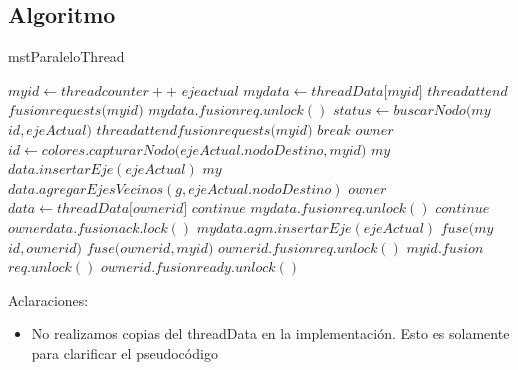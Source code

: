 \subsection{Algoritmo}
\begin{algorithm}
\begin{algorithmic}
\caption{mstParaleloThread}

\STATE $my$\textunderscore$id \gets thread$\textunderscore$counter++ $
\STATE $eje$\textunderscore$actual$
\STATE $my$\textunderscore$data \gets threadData[my$\textunderscore$id]$
\STATE $thread$\textunderscore$attend$\textunderscore$fusion$\textunderscore$requests(my$\textunderscore$id)$
\STATE $my$\textunderscore$data.fusion$\textunderscore$req.unlock()$
\STATE $status \gets buscarNodo(my$\textunderscore$id,ejeActual)$
\STATE $thread$\textunderscore$attend$\textunderscore$fusion$\textunderscore$requests(my$\textunderscore$id)$
\ENDIF
{}
\STATE $break$
\ENDIF
\STATE $owner$\textunderscore$id \gets colores.capturarNodo(ejeActual.nodoDestino,my$\textunderscore$id)$
\STATE $my$\textunderscore$data.insertarEje(ejeActual)$
\STATE $my$\textunderscore$data.agregarEjesVecinos(g,ejeActual.nodoDestino)$
\ELSE 
\STATE $owner$\textunderscore$data \gets threadData[owner$\textunderscore$id]$
\STATE $continue$
\ENDIF
{}
\STATE $my$\textunderscore$data.fusion$\textunderscore$req.unlock()$
\STATE $continue$
\ENDIF
\STATE $owner$\textunderscore$data.fusion$\textunderscore$ack.lock()$
\STATE $my$\textunderscore$data.agm.insertarEje(ejeActual)$
\STATE $fuse(my$\textunderscore$id,owner$\textunderscore$id)$
\ELSE
\STATE $fuse(owner$\textunderscore$id,my$\textunderscore$id)$
\ENDIF
\ENDIF
\ENDIF
\STATE $owner$\textunderscore$id.fusion$\textunderscore$req.unlock()$
\STATE $my$\textunderscore$id.fusion$\textunderscore$req.unlock()$
\STATE $owner$\textunderscore$id.fusion$\textunderscore$ready.unlock()$
\ENDWHILE
\end{algorithmic}
\end{algorithm}


\newpage
Aclaraciones:

\begin{itemize}
    \item No realizamos copias del threadData en la implementación. Esto es solamente para clarificar el pseudocódigo
\end{itemize}
